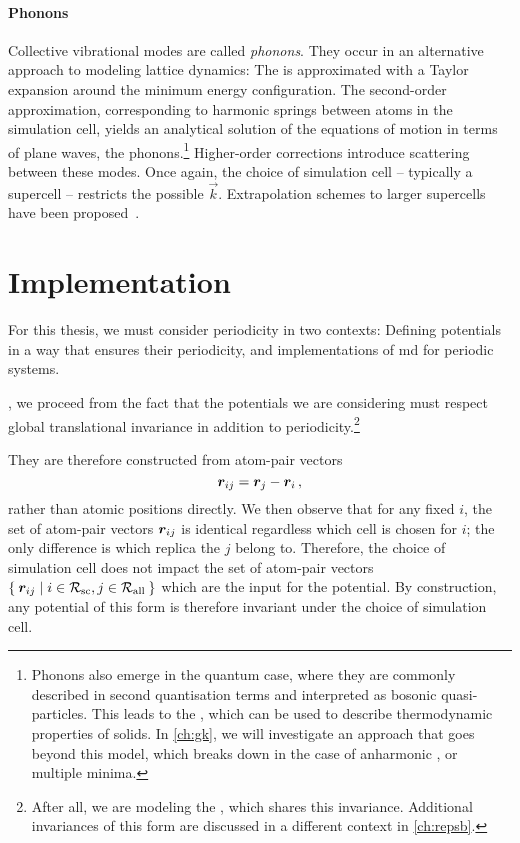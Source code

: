 \paragraph{Phonons} Collective vibrational modes are called \emph{phonons}. They occur in an alternative approach to modeling lattice dynamics: The \bo \pes is approximated with a Taylor expansion around the minimum energy configuration. The second-order approximation, corresponding to harmonic springs between atoms in the simulation cell, yields an analytical solution of the equations of motion in terms of plane waves, the phonons.\footnote{Phonons also emerge in the quantum case, where they are commonly described in second quantisation terms and interpreted as bosonic quasi-particles. This leads to the , which can be used to describe thermodynamic properties of solids. In \cref{ch:gk}, we will investigate an approach that goes beyond this model, which breaks down in the case of anharmonic \pes, or multiple minima.} Higher-order corrections introduce scattering between these modes. Once again, the choice of simulation cell -- typically a supercell -- restricts the possible $\vec{k}$. Extrapolation schemes to larger supercells have been proposed~\cite{crs2017t,ksc2023t}.

\section{Implementation}
\label{sec:pbc-imp}

For this thesis, we must consider periodicity in two contexts: Defining potentials in a way that ensures their periodicity, and implementations of \gls{md} for periodic systems.

, we proceed from the fact that the potentials we are considering must respect global translational invariance in addition to periodicity.\footnote{After all, we are modeling the \bo \pes, which shares this invariance. Additional invariances of this form are discussed in a different context in \cref{ch:repsb}.}

They are therefore constructed from atom-pair vectors
\begin{equation}
	\boldsymbol{r}_{ij} = \boldsymbol{r}_j - \boldsymbol{r}_i \,,
\end{equation}
rather than atomic positions directly.
We then observe that for any fixed $i$, the set of atom-pair vectors $\boldsymbol{r}_{ij}$ is identical regardless which cell is chosen for $i$; the only difference is which replica the $j$ belong to.
Therefore, the choice of simulation cell does not impact the set of atom-pair vectors $\Set{\boldsymbol{r}_{ij} | i \in \mathcal{R_{\text{sc}}}, j \in \mathcal{R_{\text{all}}}}$ which are the input for the potential. By construction, any potential of this form is therefore invariant under the choice of simulation cell.

